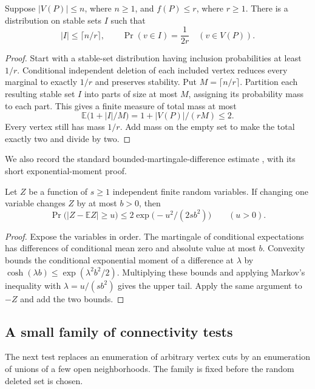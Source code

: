 \begin{lemma}\label{lem:bounded}
Suppose $|V(P)|\le n$, where $n\ge1$, and $f(P)\le r$, where $r\ge1$.
There is a distribution on stable sets $I$ such that
\[
 |I|\le\lceil n/r\rceil,
 \qquad \Pr(v\in I)=\frac1{2r}\quad(v\in V(P)).
\]
\end{lemma}
\begin{proof}
Start with a stable-set distribution having inclusion probabilities at
least $1/r$. Conditional independent deletion of each included vertex
reduces every marginal to exactly $1/r$ and preserves stability.
Put $M=\lceil n/r\rceil$. Partition each resulting stable set $I$ into
parts of size at most $M$, assigning its probability mass to each part.
This gives a finite measure of total mass at most
\[
 \mathbb E\bigl(1+|I|/M\bigr)
 =1+|V(P)|/(rM)\le2.
\]
Every vertex still has mass $1/r$. Add mass on the empty set to make the
total exactly two and divide by two.
\end{proof}

We also record the standard bounded-martingale-difference estimate
\cite{azuma1967,mcdiarmid1989}, with its short exponential-moment proof.

\begin{lemma}\label{lem:concentration}
Let $Z$ be a function of $s\ge1$ independent finite random variables.
If changing one variable changes $Z$ by at most $b>0$, then
\[
 \Pr\bigl(|Z-\mathbb EZ|\ge u\bigr)
 \le2\exp\bigl(-u^2/(2sb^2)\bigr)\qquad(u>0).
\]
\end{lemma}
\begin{proof}
Expose the variables in order. The martingale of conditional
expectations has differences of conditional mean zero and absolute
value at most $b$. Convexity bounds the conditional exponential moment
of a difference at $\lambda$ by
$\cosh(\lambda b)\le\exp(\lambda^2b^2/2)$.
Multiplying these bounds and applying Markov's inequality with
$\lambda=u/(sb^2)$ gives the upper tail. Apply the same argument to $-Z$
and add the two bounds.
\end{proof}

\subsection{A small family of connectivity tests}

The next test replaces an enumeration of arbitrary vertex cuts by an
enumeration of unions of a few open neighborhoods. The family is fixed
before the random deleted set is chosen.


